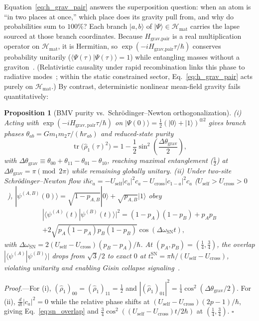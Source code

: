 \documentclass[aps,prl,reprint,superscriptaddress,nofootinbib,floatfix]{revtex4-2}
\theoremstyle{prlthm}
\newtheorem{proposition}{Proposition}
\begin{document}
Equation~\eqref{eq:h_grav_pair} answers the superposition question: when an atom is ``in two places at once,'' which place does its gravity pull from, and why do probabilities sum to $100\%$? Each branch $|a,b\rangle$ of $|\Psi\rangle\in\mathcal{H}_\text{mat}$ carries the lapse sourced at those branch coordinates. Because $H_\text{grav,pair}$ is a real multiplication operator on $\mathcal{H}_\text{mat}$, it is Hermitian, so $\exp(-iH_\text{grav,pair}\tau/\hbar)$ conserves probability unitarily ($\langle\Psi(\tau)|\Psi(\tau)\rangle=1$) while entangling masses without a graviton~\citep{Anastopoulos2018Comment,Bose2017Spin,Marletto2017Gravitationally}. (Relativistic causality under rapid recombination links this phase to radiative modes~\citep{DanielsonSatishchandranWald2022}; within the static constrained sector, Eq.~\eqref{eq:h_grav_pair} acts purely on $\mathcal{H}_\text{mat}$.) By contrast, deterministic nonlinear mean-field gravity fails quantitatively:
\begin{proposition}[BMV purity vs.\ Schr\"odinger--Newton orthogonalization]\label{prop:bmv_sn}
(i) Acting with $\exp(-iH_{\mathrm{grav,pair}}\tau/\hbar)$ on $|\Psi(0)\rangle=\tfrac{1}{2}(|0\rangle+|1\rangle)^{\otimes 2}$ gives branch phases $\theta_{ab}=Gm_1m_2\tau/(\hbar r_{ab})$ and reduced-state purity
\begin{equation}
  \operatorname{tr}\!\big(\hat{\rho}_1(\tau)^2\big)=1-\frac{1}{2}\sin^2\!\left(\frac{\Delta\theta_{\mathrm{grav}}}{2}\right),
  \label{eq:gie_phase}
\end{equation}
with $\Delta\theta_{\mathrm{grav}}\equiv\theta_{00}+\theta_{11}-\theta_{01}-\theta_{10}$, reaching maximal entanglement ($\tfrac{1}{2}$) at $\Delta\theta_{\mathrm{grav}}=\pi\pmod{2\pi}$ while remaining globally unitary.
(ii) Under two-site Schr\"odinger--Newton flow $i\hbar\dot{c}_a=-U_{\mathrm{self}}|c_a|^2c_a-U_{\mathrm{cross}}|c_{1-a}|^2c_a$ ($U_{\mathrm{self}}>U_{\mathrm{cross}}>0$~\citep{Bahrami2014}), $|\psi^{(A,B)}(0)\rangle=\sqrt{1-p_{A,B}}|0\rangle+\sqrt{p_{A,B}}|1\rangle$ obey
\begin{multline}
  |\langle\psi^{(A)}(t)|\psi^{(B)}(t)\rangle|^2=(1-p_A)(1-p_B)+p_Ap_B\\
  +2\sqrt{p_A(1-p_A)p_B(1-p_B)}\cos(\Delta\omega_{\mathrm{SN}}t),
  \label{eq:sn_overlap}
\end{multline}
with $\Delta\omega_{\mathrm{SN}}=2(U_{\mathrm{self}}-U_{\mathrm{cross}})(p_B-p_A)/\hbar$. At $(p_A,p_B)=(\tfrac{1}{4},\tfrac{3}{4})$, the overlap $|\langle\psi^{(A)}|\psi^{(B)}\rangle|$ drops from $\sqrt{3}/2$ to exact $0$ at $t_*^{\mathrm{SN}}=\pi\hbar/(U_{\mathrm{self}}-U_{\mathrm{cross}})$, violating unitarity and enabling Gisin collapse signaling~\citep{Gisin1990}.
\end{proposition}
\emph{Proof.}---For (i), $(\hat{\rho}_1)_{00}=(\hat{\rho}_1)_{11}=\tfrac{1}{2}$ and $|(\hat{\rho}_1)_{01}|^2=\tfrac{1}{4}\cos^2(\Delta\theta_\text{grav}/2)$. For (ii), $\tfrac{d}{dt}|c_a|^2=0$ while the relative phase shifts at $(U_\text{self}-U_\text{cross})(2p-1)/\hbar$, giving Eq.~\eqref{eq:sn_overlap} and $\tfrac{3}{4}\cos^2((U_\text{self}-U_\text{cross})t/2\hbar)$ at $(\tfrac{1}{4},\tfrac{3}{4})$. \hfill$\square$
\end{document}
